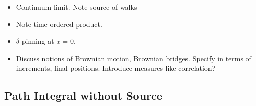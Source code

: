 \begin{itemize}
  \item {Continuum limit.  Note source of walks}
  \item Note time-ordered product.
  \item $\delta$-pinning at $x=0$.  
  \item Discuss notions of Brownian motion, Brownian bridges.  Specify in terms of increments,
    final positions.  Introduce measures like correlation?
\end{itemize}

\subsection{Path Integral without Source}

